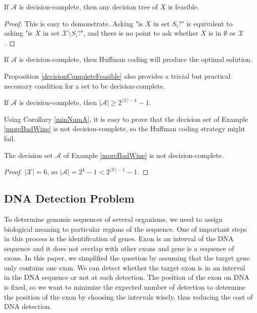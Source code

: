 \begin{proposition}
\label{decisionCompleteFeasible}
If $\mathscr{A}$ is decision-complete, then any decision tree of $X$ is feasible.
\end{proposition}

\begin{proof}
This is easy to demonstrate. Asking "is $X$ in set $S_i$?" is equivalent to asking "is $X$ in set $\mathcal{X} \setminus S_i$?", and there is no point to ask whether $X$ is in $\emptyset$ or $\mathcal{X}$.
\end{proof}

\begin{corollary}
\label{equivHuffman}
If $\mathscr{A}$ is decision-complete, then Huffman coding will produce the optimal solution.
\end{corollary}


Proposition \ref{decisionCompleteFeasible} also provides a trivial but practical necessary condition for a set to be decision-complete.

\begin{corollary}
\label{minNumA}
If $\mathscr{A}$ is decision-complete, then $|\mathscr{A}| \ge 2^{|\mathcal{X}|-1} - 1$.
\end{corollary}

Using Corollary \ref{minNumA}, it is easy to prove that the decision set of Example \ref{moreBadWine} is not decision-complete,  so the Huffman coding strategy might fail.

\begin{proposition}
The decision set $\mathscr{A}$ of Example \ref{moreBadWine} is not decision-complete.
\end{proposition}

\begin{proof}
$|\mathcal{X}|=6$, so $|\mathscr{A}| = 2^4 - 1 < 2 ^{ |\mathcal{X}|-1} - 1$.
\end{proof}

\subsection{DNA Detection Problem}
To determine genomic sequences of several organisms, we need to assign biological meaning to particular regions of the sequence. One of important steps in this  process is the identification of genes. Exon is an interval of the DNA sequence and it does not overlap with other exons and gene is a sequence of exons. In this paper, we simplified the question by assuming that the target gene only contains one exon. We can detect whether the target exon is in an interval in the DNA sequence or not at each detection. The position of the exon on DNA is fixed, so we want to minimize the expected number of detection to determine the position of the exon by choosing the intervals wisely, thus reducing the cost of DNA detection\cite{biedl2004finding}\cite{xu1998gene}.

